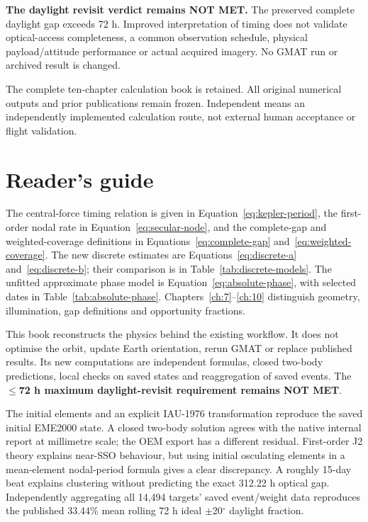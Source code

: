 \documentclass[10pt,a4paper]{article}
\numberwithin{equation}{section}
\begin{document}
\begin{warnbox}
\textbf{The daylight revisit verdict remains NOT MET.}
The preserved complete daylight gap exceeds 72 h. Improved interpretation of timing does not validate optical-access completeness, a common observation schedule, physical payload/attitude performance or actual acquired imagery. No GMAT run or archived result is changed.
\end{warnbox}
\vfill
{\fontsize{8.5}{11}\selectfont\color{atlasgray}
The complete ten-chapter calculation book is retained. All original numerical outputs and prior publications remain frozen. Independent means an independently implemented calculation route, not external human acceptance or flight validation.}
\clearpage
\tableofcontents
\clearpage
\section*{Reader's guide}
The central-force timing relation is given in Equation~\eqref{eq:kepler-period}, the first-order nodal rate in Equation~\eqref{eq:secular-node}, and the complete-gap and weighted-coverage definitions in Equations~\eqref{eq:complete-gap} and~\eqref{eq:weighted-coverage}. The new discrete estimates are Equations~\eqref{eq:discrete-a} and~\eqref{eq:discrete-b}; their comparison is in Table~\ref{tab:discrete-models}. The unfitted approximate phase model is Equation~\eqref{eq:absolute-phase}, with selected dates in Table~\ref{tab:absolute-phase}. Chapters~\ref{ch:7}--\ref{ch:10} distinguish geometry, illumination, gap definitions and opportunity fractions.


\begin{sloppypar}This book reconstructs the physics behind the existing workflow. It does not optimise the orbit, update Earth orientation, rerun GMAT or replace published results. Its new computations are independent formulas, closed two-body predictions, local checks on saved states and reaggregation of saved events. The \textbf{\ensuremath{\le}72 h maximum daylight-revisit requirement remains NOT MET}.\end{sloppypar}


\begin{sloppypar}The initial elements and an explicit IAU-1976 transformation reproduce the saved initial EME2000 state. A closed two-body solution agrees with the native internal report at millimetre scale; the OEM export has a different residual. First-order J2 theory explains near-SSO behaviour, but using initial osculating elements in a mean-element nodal-period formula gives a clear discrepancy. A roughly 15-day beat explains clustering without predicting the exact 312.22 h optical gap. Independently aggregating all 14,494 targets' saved event/weight data reproduces the published 33.44\% mean rolling 72 h ideal \ensuremath{\pm}20\ensuremath{{}^{\circ}} daylight fraction.\end{sloppypar}
\end{document}
